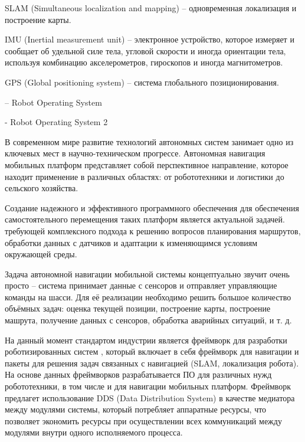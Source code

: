 SLAM (Simultaneous localization and mapping) -- одновременная локализация и
построение карты.

IMU (Inertial measurement unit) -- электронное устройство, которое измеряет и
сообщает об удельной силе тела, угловой скорости и иногда ориентации тела,
используя комбинацию акселерометров, гироскопов и иногда магнитометров. 

GPS (Global positioning system) -- система глобального позиционирования.

\ros -- Robot Operating System

\rosTwo{} - Robot Operating System 2

\renewcommand \contentsname {
	\centerline{\bfseries\large{\MakeUppercase{содержание}}}}
\newpage

{
\tableofcontents
\newpage
}

В современном мире развитие технологий автономных систем занимает одно из
ключевых мест в научно-техническом прогрессе. Автономная навигация мобильных
платформ представляет собой перспективное направление, которое находит
применение в различных областях: от робототехники и логистики до сельского
хозяйства.

Создание надежного и эффективного программного обеспечения для обеспечения
самостоятельного перемещения таких платформ является актуальной задачей.
требующей комплексного подхода к решению вопросов планирования маршрутов,
обработки данных с датчиков и адаптации к изменяющимся условиям окружающей
среды.

Задача автономной навигации мобильной системы концептуально звучит очень
просто -- система принимает данные с сенсоров и отправляет управляющие команды
на шасси. Для её реализации необходимо решить большое количество объёмных
задач: оценка текущей позиции, построение карты, построение машрута, получение
данных с сенсоров, обработка аварийных ситуаций, и т. д.

На данный момент стандартом индустрии является фреймворк для разработки
роботизированных систем \ros, который включает в себя фреймворк для навигации и
пакеты для решения задач связанных с навигацией (SLAM, локализация робота).
На основе данных фреймворков разрабатывается ПО для различных нужд
робототехники, в том числе и для навигации мобильных платформ. Фреймворк
предлагет использование DDS (Data Distribution System) в качестве медиатора
между модулями системы, который потребляет аппаратные ресурсы, что позволяет
экономить ресурсы при осуществлении всех коммуникаций между модулями внутри
одного исполняемого процесса.

